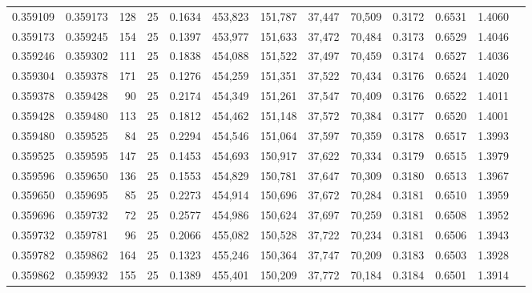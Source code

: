 \begin{tabular}{rrrrrrrrrrrrr}
0.359109 & 0.359173 &   128 &  25 &                                     0.1634 & 453,823 & 151,787 &  37,447 &  70,509 & 0.3172 & 0.6531 & 1.4060 \\
0.359173 & 0.359245 &   154 &  25 &                                     0.1397 & 453,977 & 151,633 &  37,472 &  70,484 & 0.3173 & 0.6529 & 1.4046 \\
0.359246 & 0.359302 &   111 &  25 &                                     0.1838 & 454,088 & 151,522 &  37,497 &  70,459 & 0.3174 & 0.6527 & 1.4036 \\
0.359304 & 0.359378 &   171 &  25 &                                     0.1276 & 454,259 & 151,351 &  37,522 &  70,434 & 0.3176 & 0.6524 & 1.4020 \\
0.359378 & 0.359428 &    90 &  25 &                                     0.2174 & 454,349 & 151,261 &  37,547 &  70,409 & 0.3176 & 0.6522 & 1.4011 \\
0.359428 & 0.359480 &   113 &  25 &                                     0.1812 & 454,462 & 151,148 &  37,572 &  70,384 & 0.3177 & 0.6520 & 1.4001 \\
0.359480 & 0.359525 &    84 &  25 &                                     0.2294 & 454,546 & 151,064 &  37,597 &  70,359 & 0.3178 & 0.6517 & 1.3993 \\
0.359525 & 0.359595 &   147 &  25 &                                     0.1453 & 454,693 & 150,917 &  37,622 &  70,334 & 0.3179 & 0.6515 & 1.3979 \\
0.359596 & 0.359650 &   136 &  25 &                                     0.1553 & 454,829 & 150,781 &  37,647 &  70,309 & 0.3180 & 0.6513 & 1.3967 \\
0.359650 & 0.359695 &    85 &  25 &                                     0.2273 & 454,914 & 150,696 &  37,672 &  70,284 & 0.3181 & 0.6510 & 1.3959 \\
0.359696 & 0.359732 &    72 &  25 &                                     0.2577 & 454,986 & 150,624 &  37,697 &  70,259 & 0.3181 & 0.6508 & 1.3952 \\
0.359732 & 0.359781 &    96 &  25 &                                     0.2066 & 455,082 & 150,528 &  37,722 &  70,234 & 0.3181 & 0.6506 & 1.3943 \\
0.359782 & 0.359862 &   164 &  25 &                                     0.1323 & 455,246 & 150,364 &  37,747 &  70,209 & 0.3183 & 0.6503 & 1.3928 \\
0.359862 & 0.359932 &   155 &  25 &                                     0.1389 & 455,401 & 150,209 &  37,772 &  70,184 & 0.3184 & 0.6501 & 1.3914 \\

\end{tabular}
